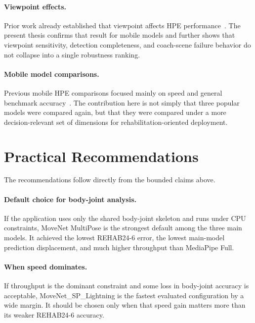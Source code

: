 \paragraph{Viewpoint effects.}
Prior work already established that viewpoint affects HPE performance~\cite{aguilarortega2023uco, baldinger2025viewing}. The present thesis confirms that result for mobile models and further shows that viewpoint sensitivity, detection completeness, and coach-scene failure behavior do not collapse into a single robustness ranking.

\paragraph{Mobile model comparisons.}
Previous mobile HPE comparisons focused mainly on speed and general benchmark accuracy~\cite{jo2022comparative, chung2022comparative}. The contribution here is not simply that three popular models were compared again, but that they were compared under a more decision-relevant set of dimensions for rehabilitation-oriented deployment.


\section{Practical Recommendations}
\label{sec:recommendations}

The recommendations follow directly from the bounded claims above.

\paragraph{Default choice for body-joint analysis.}
If the application uses only the shared body-joint skeleton and runs under CPU constraints, MoveNet MultiPose is the strongest default among the three main models. It achieved the lowest REHAB24-6 error, the lowest main-model prediction displacement, and much higher throughput than MediaPipe Full.

\paragraph{When speed dominates.}
If throughput is the dominant constraint and some loss in body-joint accuracy is acceptable, MoveNet\_SP\_Lightning is the fastest evaluated configuration by a wide margin. It should be chosen only when that speed gain matters more than its weaker REHAB24-6 accuracy.

